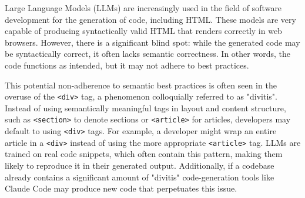 


Large Language Models (LLMs) are increasingly used in the field of software development for the generation of code, including HTML. These models are very capable of producing syntactically valid HTML that renders correctly in web browsers. However, there is a significant blind spot: while the generated code may be syntactically correct, it often lacks semantic correctness. In other words, the code functions as intended, but it may not adhere to best practices.



This potential non-adherence to semantic best practices is often seen in the overuse of the \verb|<div>| tag, a phenomenon colloquially referred to as "divitis". Instead of using semantically meaningful tags in layout and content structure, such as \verb|<section>| to denote sections or \verb|<article>| for articles, developers may default to using \verb|<div>| tags. For example, a developer might wrap an entire article in a \verb|<div>| instead of using the more appropriate \verb|<article>| tag. LLMs are trained on real code snippets, which often contain this pattern, making them likely to reproduce it in their generated output. Additionally, if a codebase already contains a significant amount of "divitis" code-generation tools like Claude Code may produce new code that perpetuates this issue.


